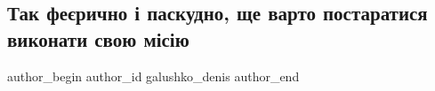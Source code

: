  
 
 
 
 

\subsection{Так феєрично і паскудно, ще варто постаратися виконати свою місію}
\label{sec:17_10_2022.fb.galushko_denis.2.tak_fe_richno___pask}

\ifcmt
 author_begin
   author_id galushko_denis
 author_end
\fi

